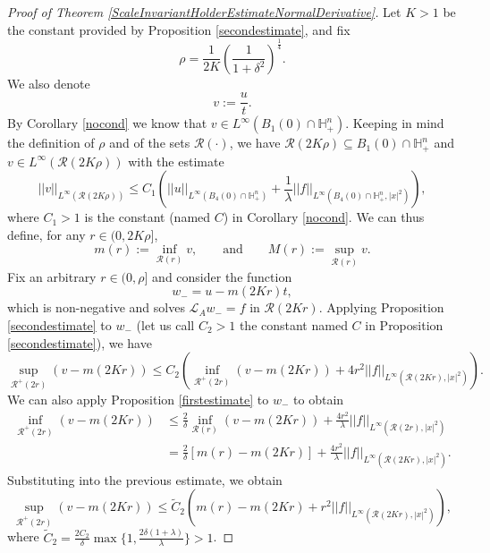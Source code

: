 \documentclass[12pt]{amsart}
\def \H {{\mathbb H}}
\def \L {\mathcal{L}}
\def \r {\mathcal R}
\begin{document}
\begin{proof}[Proof of Theorem \ref{ScaleInvariantHolderEstimateNormalDerivative}] 
Let $K>1$ be the constant provided by Proposition \ref{secondestimate}, and fix
$$
\rho= \frac{1}{2K} \left(\frac{1}{1+\delta^2}\right)^{\frac{1}{4}}.
$$
We also denote
$$
v := \frac{u}{t}.
$$
By Corollary \ref{nocond} we know that $v\in L^\infty(B_{1}(0)\cap \H^n_+)$. Keeping in mind the definition of $\rho$ and of the sets $\r(\cdot)$, we have  $\r(2K\rho)\subseteq B_{1}(0)\cap \H^n_+$ and $v\in L^\infty(\r(2K\rho))$ with the estimate
\begin{equation}\label{usolip}
||v||_{L^\infty(\r(2K\rho))}\leq
C_1 \left( ||u||_{L^{\infty}(B_{4}(0)\cap \H^n_+)} + \frac{1 }{ \lambda}  ||f||_{L^{\infty}(B_{4}(0)\cap \H^n_+,|x|^2)} \right),
\end{equation}
where $C_1>1$ is the constant (named $C$) in Corollary \ref{nocond}. We can thus define, for any $r \in (0,2K\rho]$,
\[m(r) := \inf_{\r(r)} v, \qquad\mbox{and} \qquad M(r) := \sup_{\r(r)} v.\]
Fix an arbitrary $r\in (0,\rho]$ and consider the function 
\[w_- = u - m(2Kr) t,\]
which is non-negative and solves $\L_Aw_- = f$ in $\r(2Kr)$. Applying Proposition \ref{secondestimate} to $w_-$ (let us call $C_2>1$ the constant named $C$ in Proposition \ref{secondestimate}), we have
$$\sup_{\r^+(2r)} (v-m(2Kr)) \leq C_2 \left( \inf_{\r^+(2r)} (v-m(2Kr)) + 4r^2   ||f||_{L^{\infty}(\r(2Kr),|x|^{2})}   \right).$$
We can also apply Proposition \ref{firstestimate} to $w_-$ to obtain
\begin{align*}
\inf_{\r^+(2r)} (v-m(2Kr)) &  \leq \frac{2}{\delta} \inf_{\r(r)} (v-m(2Kr)) + \frac{4r^2}{\lambda} ||f||_{L^{\infty}(\r(2r),|x|^{2})} \\
& = \frac{2}{\delta} \left[ m(r)-m(2Kr) \right] + \frac{4r^2}{\lambda} ||f||_{L^{\infty}(\r(2Kr),|x|^{2})}. 
\end{align*}
Substituting into the previous estimate, we obtain
\begin{equation}\label{first-inequality-for-oscillation}
    \sup_{\r^+(2r)} (v-m(2Kr)) \leq \tilde{C}_2\left( m(r)-m(2Kr) + r^2 ||f||_{L^{\infty}(\r(2Kr),|x|^{2})}  \right),
\end{equation}
where $\tilde{C}_2=\frac{2C_2}{\delta}\max\{1, \frac{2\delta(1+\lambda)}{\lambda}\}>1$. 


\end{proof}
\end{document}
